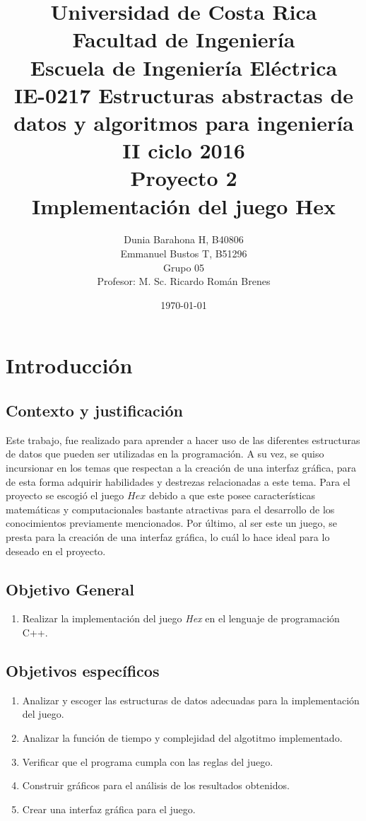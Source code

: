 \documentclass[12pt,letterpaper]{article}
\title{
Universidad de Costa Rica\\
{\small Facultad de Ingeniería\\
Escuela de Ingeniería Eléctrica\\
IE-0217 Estructuras abstractas de datos y algoritmos para ingeniería\\
II ciclo 2016\\
\vspace*{0.7in}} Proyecto 2\\ Implementación del juego Hex
\vspace*{0.7in}
}
\author{
Dunia Barahona H, B40806\\
Emmanuel Bustos T, B51296\\{\small Grupo 05}\\
Profesor: M. Sc. Ricardo Román Brenes \vspace*{0.7in}
}
\date{\today\vspace*{0.7in}}  	\setcounter{secnumdepth}{5}
\begin{document}

\maketitle

\newpage
\tableofcontents
\newpage
\listoffigures

\newpage 
\section{Introducción}
\subsection{Contexto y justificación}
Este trabajo, fue realizado para aprender a hacer uso de las diferentes estructuras de datos que pueden ser utilizadas en la programación. A su vez, se quiso incursionar en los temas que respectan a la creación de una interfaz gráfica, para de esta forma adquirir habilidades y destrezas relacionadas a este tema.
Para el proyecto se escogió el juego $Hex$ debido a que este posee características matemáticas y computacionales bastante atractivas para el desarrollo de los conocimientos previamente mencionados. Por último, al ser este un juego, se presta para la creación de una interfaz gráfica, lo cuál lo hace ideal para lo deseado en el proyecto.

\subsection{Objetivo General}
\begin{enumerate}
\item Realizar la implementación del juego \textit{Hex} en el lenguaje de programación C++. 
\end{enumerate}
\subsection{Objetivos específicos}
\begin{enumerate}
\item Analizar y escoger las estructuras de datos adecuadas para la implementación del juego.
\item Analizar la función de tiempo y complejidad del algotitmo implementado.
\item Verificar que el programa cumpla con las reglas del juego.
\item Construir gráficos para el análisis de los resultados obtenidos.
\item Crear una interfaz gráfica para el juego.
\end{enumerate}
\end{document}

